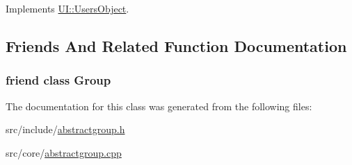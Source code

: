 Implements \hyperlink{classUI_1_1UsersObject_a925f50c5cb5123a13493f76029ae6f06}{UI::UsersObject}.



\subsection{Friends And Related Function Documentation}
\hypertarget{classCore_1_1AbstractGroup_a2697825715974a353728f0d4d5658112}{
\subsubsection[{Group}]{\setlength{\rightskip}{0pt plus 5cm}friend class {\bf Group}}}
\label{dd/d68/classCore_1_1AbstractGroup_a2697825715974a353728f0d4d5658112}


The documentation for this class was generated from the following files:\begin{DoxyCompactItemize}
\item 
src/include/\hyperlink{abstractgroup_8h}{abstractgroup.h}\item 
src/core/\hyperlink{abstractgroup_8cpp}{abstractgroup.cpp}\end{DoxyCompactItemize}
